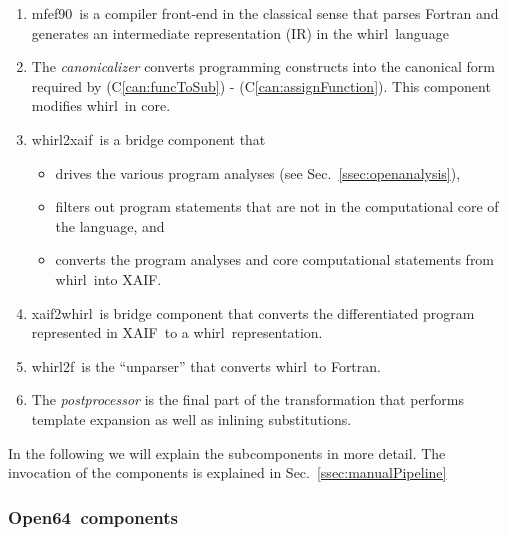 \documentclass[11pt]{article}
\newcommand{\mfefninety}{mfef90}
\newcommand{\OpenSixtyFour}{Open64}
\newcommand{\xaif}{XAIF}
\newcommand{\whirl}{whirl}
\newcommand{\whirlToxaif}{whirl2xaif}
\newcommand{\whirlTof}{whirl2f}
\newcommand{\xaifTowhirl}{xaif2whirl}
\newcommand{\refcan}[1]{(C\ref{#1})}
\newcommand{\refsec}[1]{{Sec.~\ref{#1}}}
\begin{document}
   \begin{enumerate}	
     \item \mfefninety\ is a compiler front-end in the classical sense that parses
       Fortran and generates an intermediate representation (IR)
       in the \whirl\ language

     \item The {\em canonicalizer} converts  
        programming constructs into the canonical form required by 
	\refcan{can:funcToSub} - \refcan{can:assignFunction}. 
	This component modifies \whirl\ in core.

     \item \whirlToxaif\ is a bridge component that
        \begin{itemize}
           \item drives the various program analyses (see \refsec{ssec:openanalysis}),
        
           \item filters out program statements that are not in the
                 computational core of the language, and 

           \item converts the program analyses and core computational
                 statements from \whirl\ into \xaif.
        \end{itemize}

     \item \xaifTowhirl\ is bridge component that converts the 
        differentiated program represented in \xaif\ 
        to a \whirl\ representation.

     \item \whirlTof\ is the ``unparser'' that converts \whirl\ to
        Fortran.

     \item The {\em postprocessor} is the  final part of the transformation that
        performs template expansion as well as inlining substitutions.

   \end{enumerate}

In the following we will explain the subcomponents in more detail.
The invocation of the components is explained in
\refsec{ssec:manualPipeline}

\subsubsection{\OpenSixtyFour\ components} \label{sssec:mfef}
\end{document}
